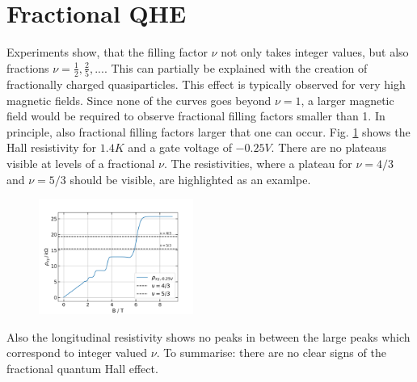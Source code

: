 \section{Fractional QHE}

Experiments show, that the filling factor $\nu$ not only takes integer values, but also fractions $\nu=\frac{1}{2}, \frac{2}{5}, ...$.
This can partially be explained with the creation of fractionally charged quasiparticles.
This effect is typically observed for very high magnetic fields.
Since none of the curves goes beyond $\nu = 1$, 
a larger magnetic field would be required to observe fractional filling factors smaller than 1.
In principle, also fractional filling factors larger that one can occur.
Fig. \ref{fig:FQHE} shows the Hall resistivity for $1.4K$ and a gate voltage of $-0.25V$.
There are no plateaus visible at levels of a fractional $\nu$.
The resistivities, where a plateau for $\nu = 4/3$ and $\nu = 5/3$ should be visible, are highlighted as an examlpe.
\begin{figure}[h]
    \centering
    \includegraphics[width=0.45\textwidth]{../Images/FQHE.png}
    \caption{
        }
    \label{fig:FQHE}
\end{figure}
Also the longitudinal resistivity shows no peaks in between the large peaks which correspond to integer valued $\nu$.
To summarise: there are no clear signs of the fractional quantum Hall effect.







